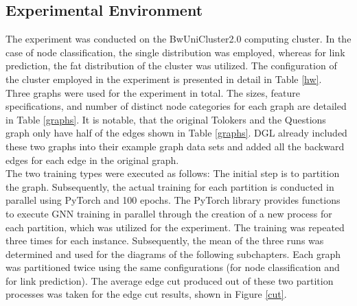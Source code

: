 \documentclass[acmsmall,nonacm,screen,review]{acmart}
\begin{document}
\subsection{Experimental Environment}
The experiment was conducted on the BwUniCluster2.0 computing cluster. In the case of node classification, the single distribution was employed, whereas for link prediction, the fat distribution of the cluster was utilized. The configuration of the cluster employed in the experiment is presented in detail in Table \ref{hw}.\\
Three graphs were used for the experiment in total. The sizes, feature specifications, and number of distinct node categories for each graph are detailed in Table \ref{graphs}. It is notable, that the original Tolokers and the Questions graph only have half of the edges shown in Table \ref{graphs}. DGL already included these two graphs into their example graph data sets and added all the backward edges for each edge in the original graph.\\
The two training types were executed as follows: The initial step is to partition the graph. Subsequently, the actual training for each partition is conducted in parallel using PyTorch \cite{PyTorch} and 100 epochs. The PyTorch library provides functions to execute GNN training in parallel through the creation of a new process for each partition, which was utilized for the experiment. The training was repeated three times for each instance. Subsequently, the mean of the three runs was determined and used for the diagrams of the following subchapters. Each graph was partitioned twice using the same configurations (for node classification and for link prediction). The average edge cut produced out of these two partition processes was taken for the edge cut results, shown in Figure \ref{cut}.
\end{document}
